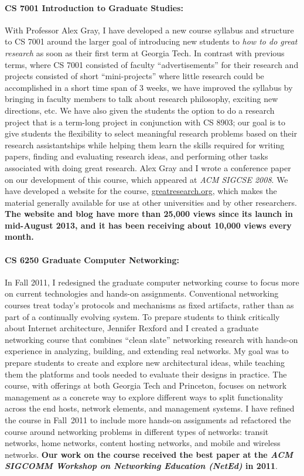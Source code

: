 \paragraph{CS 7001 Introduction to Graduate Studies:}
With Professor Alex Gray, I have developed a new course syllabus and
structure to CS 7001 around the larger goal of introducing new students
to {\em how to do great research} as soon as their first term at Georgia
Tech.  In contrast with previous terms, where CS 7001 consisted of
faculty ``advertisements'' for their research and projects consisted of
short ``mini-projects'' where little research could be accomplished in a
short time span of 3 weeks, we have improved the syllabus by bringing in
faculty members to talk about research philosophy, exciting new
directions, etc.  We have also given the students the option to do a
research project that is a term-long project in conjunction with CS
8903; our goal is to give students the flexibility to select meaningful
research problems based on their research assistantships while helping
them learn the skills required for writing papers, finding and
evaluating research ideas, and performing other tasks associated with
doing great research.  Alex Gray and I wrote a conference paper on our
development of this course, which appeared at {\em ACM SIGCSE 2008}.  We
have developed a website for the course, \url{greatresearch.org}, which
makes the material generally available for use at other universities and
by other researchers.  {\bf The website and blog have more than 25,000 views
since its launch in mid-August 2013, and it has been receiving about
10,000 views every month.}

\paragraph{CS 6250 Graduate Computer Networking:} In Fall 2011, I redesigned the
graduate computer networking course to focus more on current
technologies and hands-on assignments.  Conventional networking courses
treat today's protocols and mechanisms as fixed artifacts, rather than
as part of a continually evolving system.  To prepare students to think
critically about Internet architecture, Jennifer Rexford and I created a
graduate networking course that combines ``clean slate'' networking
research with hands-on experience in analyzing, building, and extending
real networks.  My goal was to prepare students to create and explore
new architectural ideas, while teaching them the platforms and tools
needed to evaluate their designs in practice.  The course, with
offerings at both Georgia Tech and Princeton, focuses on network
management as a concrete way to explore different ways to split
functionality across the end hosts, network elements, and management
systems.  I have refined the course in Fall~2011 to include more
hands-on assignments ad refactored the course around networking problems
in different types of networks: transit networks, home networks, content
hosting networks, and mobile and wireless networks.  {\bf Our work on
  the course received the best paper at the {\em ACM SIGCOMM Workshop on
    Networking Education (NetEd)} in 2011}.

